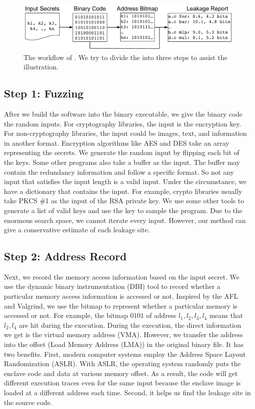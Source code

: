 \begin{figure}[ht]
  \centering
  \includegraphics[width=\columnwidth]{./figures/chapter5/workflow.pdf}
  \caption{The workflow of \ctool{}. We try to divide the \ctool{} into three steps to assist the illustration. }\label{chapter5:fig:workflow}
\end{figure}

\subsection{Step 1: Fuzzing}
After we build the software into the binary executable, we give the
binary code the random inputs. For cryptography libraries, the input
is the encryption key. For non-cryptography libraries, the input could
be images, text, and information in another format. Encryption
algorithms like AES and DES take an array representing the secrets. We
generate the random input by flipping each bit of the keys. Some other
programs also take a buffer as the input. The buffer may contain the
redundancy information and follow a specific format. So not any input
that satisfies the input length is a valid input. Under the
circumstance, we have a dictionary that contains the input. For
example, crypto libraries usually take PKCS \#1 as the input of the
RSA private key. We use some other tools to generate a list of valid
keys and use the key to sample the program. Due to the enormous search
space, we cannot iterate every input. However, our method can give a
conservative estimate of each leakage site.
\subsection{Step 2: Address Record}
Next, we record the memory access information based on the input
secret. We use the dynamic binary instrumentation (DBI) tool to record
whether a particular memory access information is accessed or
not. Inspired by the AFL and Valgrind, we use the bitmap to represent
whether a particular memory is accessed or not. For example, the
bitmap ${0101}$ of address $l_1, l_2, l_3, l_4$ means that $l_2, l_4$
are hit during the execution. During the execution, the direct
information we get is the virtual memory address (VMA). However, we
transfer the address into the offset (Load Memory Address (LMA)) in
the original binary file. It has two benefits. First, modern computer
systems employ the Address Space Layout Randomization (ASLR). With
ASLR, the operating system randomly puts the enclave code and data at
various memory offset. As a result, the code will get different
execution traces even for the same input because the enclave image is
loaded at a different address each time. Second, it helps us find the
leakage site in the source code.

